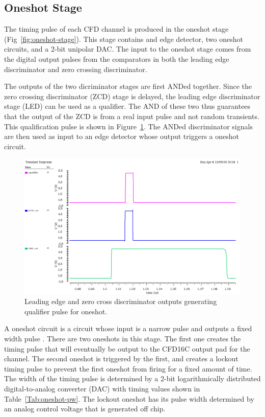 \documentclass[12pt,oneside,final]{siuethesis}
\theoremstyle{definition}
\begin{document}
\subsection{Oneshot Stage}
\par The timing pulse of each CFD channel is produced in the oneshot stage (Fig~\ref{fig:oneshot-stage}). This stage contains and edge detector, two oneshot circuits, and a 2-bit unipolar DAC. The input to the oneshot stage comes from the digital output pulses from the comparators in both the leading edge discriminator and zero crossing discriminator. 
\par The outputs of the two dicriminator stages are first ANDed together. Since the zero crossing discriminator (ZCD) stage is delayed, the leading edge discriminator stage (LED) can be used as a qualifier. The AND of these two thus guarantees that the output of the ZCD is from a real input pulse and not random transients. This qualification pulse is shown in Figure~\ref{fig:qualifier}. The ANDed discriminator signals are then used as input to an edge detector whose output triggers a oneshot circuit.
\begin{figure}[ht]
\centering
\includegraphics[scale=.4,keepaspectratio=true]{images/qualifier.png} 
\caption{Leading edge and zero cross discriminator outputs generating qualifier pulse for oneshot.}
\label{fig:qualifier}
\end{figure}
\par A oneshot circuit is a circuit whose input is a narrow pulse and outputs a fixed width pulse \cite{ONESHOT}. There are two oneshots in this stage. The first one creates the timing pulse that will eventually be output to the CFD16C output pad for the channel. The second oneshot is triggered by the first, and creates a lockout timing pulse to prevent the first oneshot from firing for a fixed amount of time. The width of the timing pulse is determined by a 2-bit logarithmically distributed digital-to-analog converter (DAC) with timing values shown in Table~\ref{Tab:oneshot-pw}. The lockout oneshot has its pulse width determined by an analog control voltage that is generated off chip.
\end{document}
